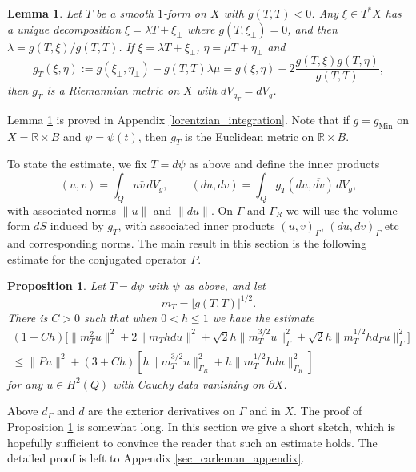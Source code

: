 \documentclass[11pt,letterpaper]{amsart}
\newtheorem{Lemma}[Theorem]{Lemma}
\newtheorem{Proposition}[Theorem]{Proposition}
\theoremstyle{definition}
\numberwithin{equation}{section}
\newcommand{\mR}{\mathbb{R}}                    %
\newcommand{\norm}[1]{\lVert #1 \rVert}         %
\newcommand{\ol}[1]{\overline{#1}}
\newcommand{\p}{\partial}
\newcommand{\gm}{g_{\mathrm{Min}}}
\def\p{\partial}
\begin{document}
\begin{Lemma} \label{lemma_ht_riemannian}
Let $T$ be a smooth $1$-form on $X$ with $g(T,T) < 0$. Any $\xi \in T^* X$ has a unique decomposition $\xi = \lambda T + \xi_{\perp}$ where $g(T, \xi_{\perp}) = 0$, and then $\lambda = g(T,\xi)/g(T,T)$. If $\xi = \lambda T + \xi_{\perp}$, $\eta = \mu T + \eta_{\perp}$ and 
\[
g_T(\xi, \eta) := g(\xi_{\perp}, \eta_{\perp}) - g(T, T) \lambda \mu = g(\xi, \eta) - 2 \frac{g(T,\xi)g(T,\eta)}{g(T,T)},
\]
then $g_T$ is a Riemannian metric on $X$ with $dV_{g_T} = dV_g$.
\end{Lemma}

Lemma \ref{lemma_ht_riemannian} is proved in Appendix \ref{lorentzian_integration}. Note that if $g = \gm$ on $X = \mR \times \ol{B}$ and $\psi = \psi(t)$, then $g_T$ is the Euclidean metric on $\mR \times \ol{B}$.

To state the estimate, we fix $T = d\psi$ as above and define the inner products 
\[
(u, v) = \int_Q u \bar{v} \,dV_{g}, \qquad (du, dv) = \int_Q g_T(du, \ol{dv}) \,dV_{g},
\]
with associated norms $\norm{u}$ and $\norm{du}$. On $\Gamma$ and $\Gamma_R$ we will use the volume form $dS$ induced by $g_T$, with associated inner products $(u, v)_{\Gamma}$, $(du, dv)_{\Gamma}$ etc and corresponding norms. The main result in this section is the following estimate for the conjugated operator $P$.

\begin{Proposition} \label{prop_semiclassical_estimate}
Let $T = d\psi$ with $\psi$ as above, and let %
\[
m_T = |g(T,T)|^{1/2}.
\]
There is $C> 0$ 
such that when $0 < h \leq 1$ we have the estimate 
\begin{align*}
(1-Ch) \Big[ \norm{m_T^2 u}^2 + 2 \norm{m_T h du}^2 + \sqrt{2} h \norm{m_T^{3/2} u}_{\Gamma}^2 + \sqrt{2} h \norm{m_T^{1/2} h d_{\Gamma} u}_{\Gamma}^2 \Big] \\
 \leq \norm{Pu}^2 + (3+Ch) \left[ h \norm{m_T^{3/2} u}_{\Gamma_R}^2 + h \norm{m_T^{1/2} h d u}_{\Gamma_R}^2 \right]
\end{align*}
for any $u \in H^2(Q)$ with Cauchy data vanishing on $\p X$.
\end{Proposition}

Above $d_{\Gamma}$ and $d$ are the exterior derivatives on $\Gamma$ and in $X$. The proof of Proposition \ref{prop_semiclassical_estimate} is somewhat long. In this section we give a short sketch, which is hopefully sufficient to convince the reader that such an estimate holds. The detailed proof is left to Appendix \ref{sec_carleman_appendix}.
\end{document}
